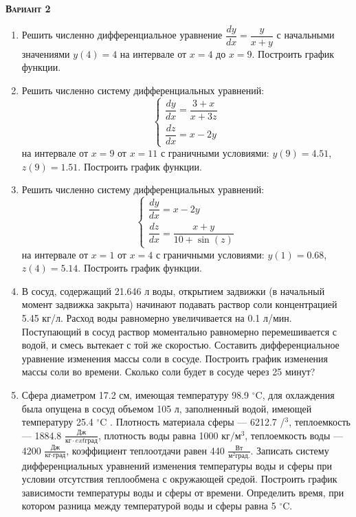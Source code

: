 \textsc{\textbf{Вариант 2}}
\begin{enumerate}
\item Решить численно дифференциальное уравнение $\dfrac{dy}{dx}=\dfrac{y}{x+y}         $ с начальными значениями $y(     4)=     4$ на интервале от $x=     4$ до $x=     9$. Построить график функции.\item Решить численно систему дифференциальных уравнений:
 \begin{equation*}
\left\{
\begin{gathered}
\dfrac{dy}{dx}=\dfrac{3+x}{x+3z}     \\
\dfrac{dz}{dx}=x-2y                  
\end{gathered}
\right.
\end{equation*}
на интервале от $x= 9$ от $x=11$ с граничными условиями: $y( 9)=4.51$, $z( 9)=1.51$. Построить график функции. 
\item Решить численно систему дифференциальных уравнений:
 \begin{equation*}
\left\{
\begin{gathered}
\dfrac{dy}{dx}=x-2y\\
\dfrac{dz}{dx}=\dfrac{x+y}{10+\sin(z)}
\end{gathered}
\right.
\end{equation*}
на интервале от $x= 1$ от $x= 4$ с граничными условиями: $y( 1)=0.68$, $z( 4)=5.14$.  Построить график функции. 
\item  В сосуд, содержащий 21.646 л воды, открытием задвижки (в начальный момент задвижка закрыта) начинают подавать раствор соли концентрацией 5.45 кг/л. Расход воды равномерно увеличивается на 0.1 л/мин. Поступающий в сосуд раствор моментально равномерно перемешивается с водой, и смесь вытекает с той же скоростью. Составить дифференциальное уравнение изменения массы соли в сосуде. Построить график изменения массы соли во времени. Сколько соли будет в сосуде через  25 минут?

\item  Сфера диаметром 17.2 см, имеющая температуру 98.9 $^\circ\mathrm{C}$, для охлаждения была опущена в сосуд объемом  105 л, заполненный водой, имеющей температуру 25.4 $^\circ\mathrm{C}$ . Плотность материала сферы --- 6212.7 /$^\mathrm{3}$, теплоемкость --- 1884.8 $\frac{\text{Дж}}{\text{кг}\cdot 	ext{град}}$, плотность воды равна 1000 $\text{кг}/\text{м}^\mathrm{3}$, теплоемкость воды --- 4200 $\frac{\text{Дж}}{\text{кг}\cdot \text{град}}$, коэффициент теплоотдачи равен   440 $\frac{\text{Вт}}{\text{м}^2 \text{град.}}$. Записать систему дифференциальных уравнений изменения температуры воды и сферы при условии отсутствия теплообмена с окружающей средой. Построить график зависимости температуры воды и сферы от времени. Определить время, при котором разница между температурой воды и сферы равна 5 $^\circ\mathrm{C}$. 

\end{enumerate}

